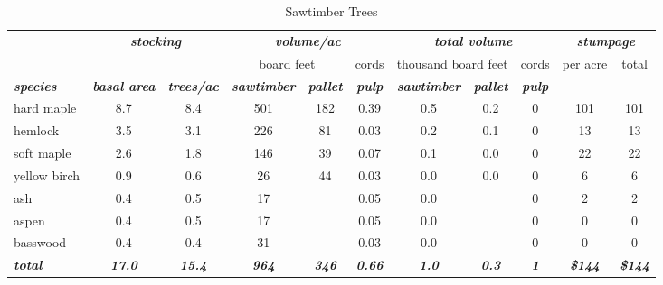 \documentclass[landscape]{article}
\begin{document}
\begin{table}[H]

\caption{\label{tab:unnamed-chunk-47}Sawtimber Trees}
\fontsize{10}{12}\selectfont
\begin{tabular}[t]{lcccccccccc}
\toprule
\multicolumn{1}{c}{\em{\textbf{ }}} & \multicolumn{2}{c}{\em{\textbf{stocking}}} & \multicolumn{3}{c}{\em{\textbf{volume/ac }}} & \multicolumn{3}{c}{\em{\textbf{total volume}}} & \multicolumn{2}{c}{\em{\textbf{stumpage}}} \\
\cmidrule(l{3pt}r{3pt}){2-3} \cmidrule(l{3pt}r{3pt}){4-6} \cmidrule(l{3pt}r{3pt}){7-9} \cmidrule(l{3pt}r{3pt}){10-11}
\multicolumn{3}{c}{ } & \multicolumn{2}{c}{board feet} & \multicolumn{1}{c}{cords} & \multicolumn{2}{c}{thousand board feet} & \multicolumn{1}{c}{cords} & \multicolumn{1}{c}{per acre} & \multicolumn{1}{c}{total} \\
\cmidrule(l{3pt}r{3pt}){4-5} \cmidrule(l{3pt}r{3pt}){6-6} \cmidrule(l{3pt}r{3pt}){7-8} \cmidrule(l{3pt}r{3pt}){9-9} \cmidrule(l{3pt}r{3pt}){10-10} \cmidrule(l{3pt}r{3pt}){11-11}
\rowcolor[HTML]{DCDCDC}  \em{\textbf{species}} & \em{\textbf{basal area}} & \em{\textbf{trees/ac}} & \em{\textbf{sawtimber}} & \em{\textbf{pallet}} & \em{\textbf{pulp}} & \em{\textbf{sawtimber}} & \em{\textbf{pallet}} & \em{\textbf{pulp}} & \em{\textbf{ }} & \em{\textbf{ }}\\
\midrule
\rowcolor{gray!6}  hard maple & 8.7 & 8.4 & 501 & 182 & 0.39 & 0.5 & 0.2 & 0 & 101 & 101\\
 
hemlock & 3.5 & 3.1 & 226 & 81 & 0.03 & 0.2 & 0.1 & 0 & 13 & 13\\
 
\rowcolor{gray!6}  soft maple & 2.6 & 1.8 & 146 & 39 & 0.07 & 0.1 & 0.0 & 0 & 22 & 22\\
 
yellow birch & 0.9 & 0.6 & 26 & 44 & 0.03 & 0.0 & 0.0 & 0 & 6 & 6\\
 
\rowcolor{gray!6}  ash & 0.4 & 0.5 & 17 &  & 0.05 & 0.0 &  & 0 & 2 & 2\\
 
aspen & 0.4 & 0.5 & 17 &  & 0.05 & 0.0 &  & 0 & 0 & 0\\
 
\rowcolor{gray!6}  basswood & 0.4 & 0.4 & 31 &  & 0.03 & 0.0 &  & 0 & 0 & 0\\
 
\rowcolor[HTML]{DCDCDC}  \em{\textbf{total}} & \em{\textbf{17.0}} & \em{\textbf{15.4}} & \em{\textbf{964}} & \em{\textbf{346}} & \em{\textbf{0.66}} & \em{\textbf{1.0}} & \em{\textbf{0.3}} & \em{\textbf{1}} & \em{\textbf{\$144}} & \em{\textbf{\$144}}\\
\bottomrule
\end{tabular}
\end{table}
\end{document}
